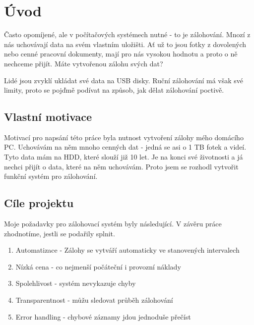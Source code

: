 \documentclass[a4paper,12pt, oneside]{book}
\begin{document}
\tableofcontents

\clearpage
\pagestyle{fancy}

\chapter{Úvod}

Často opomíjené, ale v počítačových systémech nutné - to je zálohování.
Mnozí z nás uchovávají data na svém vlastním uložišti. Ať už to jsou
fotky z dovolených nebo cenné pracovní dokumenty, mají pro nás vysokou hodnotu
a proto o ně nechceme přijít. Máte vytvořenou zálohu svých dat? 

Lidé jsou zvyklí ukládat své data na USB disky. Ruční zálohování má však své limity,
proto se pojďmě podívat na způsob, jak dělat zálohování poctivě.


\section{Vlastní motivace}

Motivací pro napsání této práce byla nutnost vytvoření zálohy mého
domácího PC. Uchovávám na něm mnoho cenných dat -
jedná se asi o 1 TB fotek a videí. Tyto data mám na HDD, které
slouží již 10 let. Je na konci své životnosti a já nechci přijít o data,
které na něm uchovávám. Proto jsem se rozhodl vytvořit funkční systém 
pro zálohování.



\section{Cíle projektu}

Moje požadavky pro zálohovací systém byly následující. V závěru práce zhodnotíme, 
jestli se podařily splnit.

\begin{enumerate}
	\item Automatizace - Zálohy se vytváří automaticky ve stanovených intervalech
	\item Nízká cena - co nejmenší počáteční i provozní náklady
	\item Spolehlivost - systém nevykazuje chyby
	\item Transparentnost - můžu sledovat průběh zálohování
	\item Error handling - chybové záznamy jdou jednoduše přečíst
\end{enumerate}
\end{document}

